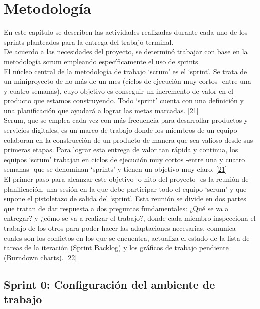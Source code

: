 \chapter{Metodología} \label{cap:siete}

En este capítulo se describen las actividades realizadas durante cada uno de los sprints planteados para la entrega del trabajo terminal.\\

De acuerdo a las necesidades del proyecto, se determinó trabajar con base en la metodología scrum empleando específicamente el uso de sprints.\\

El núcleo central de la metodología de trabajo ‘scrum’ es el ‘sprint’. Se trata de un miniproyecto de no más de un mes (ciclos de ejecución muy cortos -entre una y cuatro semanas), cuyo objetivo es conseguir un incremento de valor en el producto que estamos construyendo. Todo ‘sprint’ cuenta con una definición y una planificación que ayudará a lograr las metas marcadas. \hyperlink{b21}{[21]}\\ 

Scrum, que se emplea cada vez con más frecuencia para desarrollar productos y servicios digitales, es un marco de trabajo donde los miembros de un equipo colaboran en la construcción de un producto de manera que sea valioso desde sus primeras etapas. Para lograr esta entrega de valor tan rápida y continua, los equipos ‘scrum’ trabajan en ciclos de ejecución muy cortos -entre una y cuatro semanas- que se denominan ‘sprints’ y tienen un objetivo muy claro. \hyperlink{b21}{[21]}\\ 

El primer paso para alcanzar este objetivo -o hito del proyecto- es la reunión de planificación, una sesión en la que debe participar todo el equipo ‘scrum’ y que supone el pistoletazo de salida del ‘sprint’. Esta reunión se divide en dos partes que tratan de dar respuesta a dos preguntas fundamentales: ¿Qué se va a entregar? y ¿cómo se va a realizar el trabajo?, donde cada miembro inspecciona el trabajo de los otros para poder hacer las adaptaciones necesarias, comunica cuales son los confictos en los que se encuentra, actualiza el estado de la lista de tareas de la iteración (Sprint Backlog) y los gráficos de trabajo pendiente (Burndown charts). \hyperlink{b22}{[22]}\\ 

\section{Sprint 0: Configuración del ambiente de trabajo}

